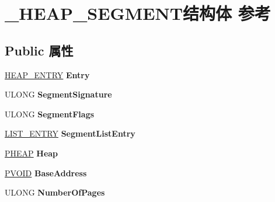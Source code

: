 \hypertarget{struct___h_e_a_p___s_e_g_m_e_n_t}{}\section{\+\_\+\+H\+E\+A\+P\+\_\+\+S\+E\+G\+M\+E\+N\+T结构体 参考}
\label{struct___h_e_a_p___s_e_g_m_e_n_t}
\subsection*{Public 属性}
\begin{DoxyCompactItemize}
\item 
\mbox{\label{struct___h_e_a_p___s_e_g_m_e_n_t_acc74de4c827a764ee30dd2a738938798}} 
\hyperlink{struct___h_e_a_p___e_n_t_r_y}{H\+E\+A\+P\+\_\+\+E\+N\+T\+RY} {\bfseries Entry}
\item 
\mbox{\label{struct___h_e_a_p___s_e_g_m_e_n_t_a8b394776f7d85c4cdf32ec877fff7d1e}} 
U\+L\+O\+NG {\bfseries Segment\+Signature}
\item 
\mbox{\label{struct___h_e_a_p___s_e_g_m_e_n_t_aaa5e0cce77751d978ec26b97e031e6c0}} 
U\+L\+O\+NG {\bfseries Segment\+Flags}
\item 
\mbox{\label{struct___h_e_a_p___s_e_g_m_e_n_t_a39327ac4697bad3e5fea6379c66d1705}} 
\hyperlink{struct___l_i_s_t___e_n_t_r_y}{L\+I\+S\+T\+\_\+\+E\+N\+T\+RY} {\bfseries Segment\+List\+Entry}
\item 
\mbox{\label{struct___h_e_a_p___s_e_g_m_e_n_t_a803653cd09e9ed1fe39e562ad8701f28}} 
\hyperlink{struct___h_e_a_p}{P\+H\+E\+AP} {\bfseries Heap}
\item 
\mbox{\label{struct___h_e_a_p___s_e_g_m_e_n_t_a197e9cfed85bf6223d6aca63d811cd30}} 
\hyperlink{interfacevoid}{P\+V\+O\+ID} {\bfseries Base\+Address}
\item 
\mbox{\label{struct___h_e_a_p___s_e_g_m_e_n_t_a6fe751f59aea029a04d7f3365815e3ef}} 
U\+L\+O\+NG {\bfseries Number\+Of\+Pages}
\item 

\end{DoxyCompactItemize}
